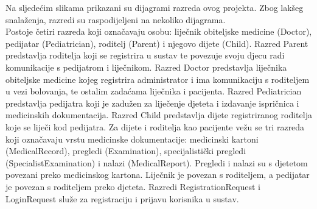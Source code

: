 			\text Na sljedećim slikama prikazani su dijagrami razreda ovog projekta. Zbog lakšeg snalaženja, razredi su raspodijeljeni na nekoliko dijagrama.\\
			Postoje četiri razreda koji označavaju osobu: liječnik obiteljske medicine (Doctor), pedijatar (Pediatrician), roditelj (Parent) i njegovo dijete (Child). Razred Parent predstavlja roditelja koji se registrira u sustav te povezuje svoju djecu radi komunikacije s pedijatrom i liječnikom. Razred Doctor predstavlja liječnika obiteljske medicine kojeg registrira administrator i ima komunikaciju s roditeljem u vezi bolovanja, te ostalim zadaćama liječnika i pacijenta. Razred Pediatrician predstavlja pedijatra koji je zadužen za liječenje djeteta i izdavanje ispričnica i medicinskih dokumentacija. Razred Child predstavlja dijete registriranog roditelja koje se liječi kod pedijatra. Za dijete i roditelja kao pacijente vežu se tri razreda koji označavaju vrstu medicinske dokumentacije: medicinski kartoni (MedicalRecord), pregledi (Examination), specijalistički pregledi (SpecialistExamination) i nalazi (MedicalReport). Pregledi i nalazi su s djetetom povezani preko medicinskog kartona. Liječnik je povezan s roditeljem, a pedijatar je povezan s roditeljem preko djeteta. Razredi RegistrationRequest i LoginRequest služe za registraciju i prijavu korisnika u sustav.
				 
